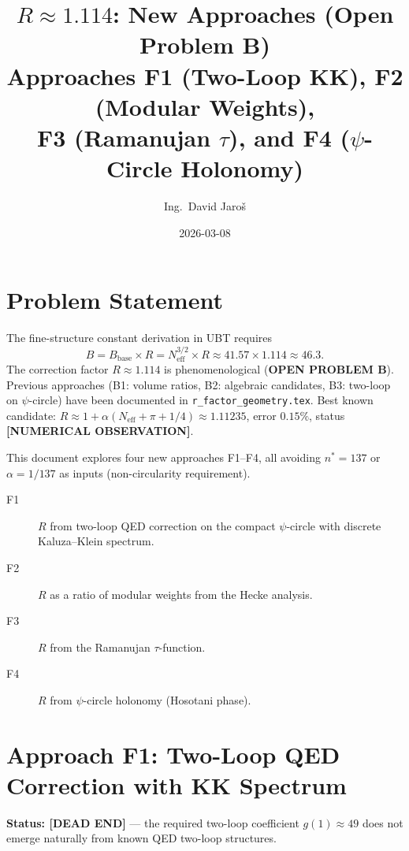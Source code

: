 \documentclass[11pt,a4paper]{article}
\title{$R \approx 1.114$: New Approaches (Open Problem B)\\
    \large Approaches F1 (Two-Loop KK), F2 (Modular Weights),\\
    F3 (Ramanujan $\tau$), and F4 ($\psi$-Circle Holonomy)}
\author{Ing.\ David Jaroš}
\date{2026-03-08}
\theoremstyle{remark}
\begin{document}
  \maketitle
\fi

\section{Problem Statement}
\label{sec:r_new_problem}

The fine-structure constant derivation in UBT requires
\begin{equation}
  B = B_{\mathrm{base}} \times R
    = N_{\mathrm{eff}}^{3/2} \times R
    \approx 41.57 \times 1.114
    \approx 46.3.
\end{equation}
The correction factor $R \approx 1.114$ is phenomenological (\textbf{OPEN PROBLEM B}).
Previous approaches (B1: volume ratios, B2: algebraic candidates, B3: two-loop
on $\psi$-circle) have been documented in \texttt{r\_factor\_geometry.tex}.
Best known candidate: $R \approx 1 + \alpha(N_{\mathrm{eff}} + \pi + 1/4) \approx
1.11235$, error $0.15\%$, status \textbf{[NUMERICAL OBSERVATION]}.

This document explores four new approaches F1–F4, all avoiding $n^* = 137$
or $\alpha = 1/137$ as inputs (non-circularity requirement).

\begin{description}
  \item[F1] $R$ from two-loop QED correction on the compact $\psi$-circle
            with discrete Kaluza--Klein spectrum.
  \item[F2] $R$ as a ratio of modular weights from the Hecke analysis.
  \item[F3] $R$ from the Ramanujan $\tau$-function.
  \item[F4] $R$ from $\psi$-circle holonomy (Hosotani phase).
\end{description}

\section{Approach F1: Two-Loop QED Correction with KK Spectrum}
\label{sec:F1_twoloop_KK}

\textbf{Status: [DEAD END]} — the required two-loop coefficient $g(1) \approx 49$
does not emerge naturally from known QED two-loop structures.
\end{document}
